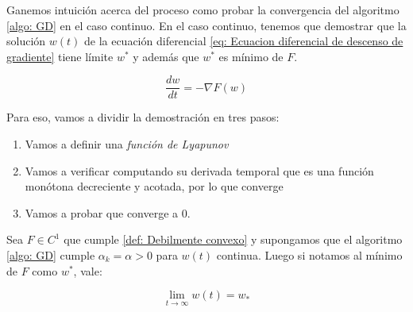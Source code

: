 Ganemos intuici\'on acerca del proceso como probar la convergencia del algoritmo \ref{algo: GD} en el caso continuo. En el caso continuo, tenemos que demostrar que la soluci\'on $w(t)$ de la ecuaci\'on diferencial \ref{eq: Ecuacion diferencial de descenso de gradiente} tiene l\'imite $w^*$ y adem\'as que $w^*$ es m\'inimo de $F$.

\begin{equation}
\label{eq: Ecuacion diferencial de descenso de gradiente}
\dfrac{d w}{dt} = - \nabla F(w)
\end{equation}

Para eso, vamos a dividir la demostraci\'on en tres pasos:

\begin{enumerate}
	\item Vamos a definir una \textit{funci\'on de Lyapunov}
	\item Vamos a verificar computando su derivada temporal que es una funci\'on mon\'otona decreciente y acotada, por lo que converge
	\item Vamos a probar que converge a 0.
\end{enumerate}

\begin{proposition}
	\label{Objetivo debilmente convexo, GD continue converge}
	Sea $F \in C^1$ que cumple \ref{def: Debilmente convexo} y supongamos que el algoritmo \ref{algo: GD} cumple $\alpha_k=\alpha>0$ para $w(t)$ continua. Luego si notamos al m\'inimo de $F$ como $w^*$, vale:
	
	\begin{equation*}
		\lim\limits_{t \rightarrow \infty} w(t) =  w_*
	\end{equation*}

\end{proposition}

